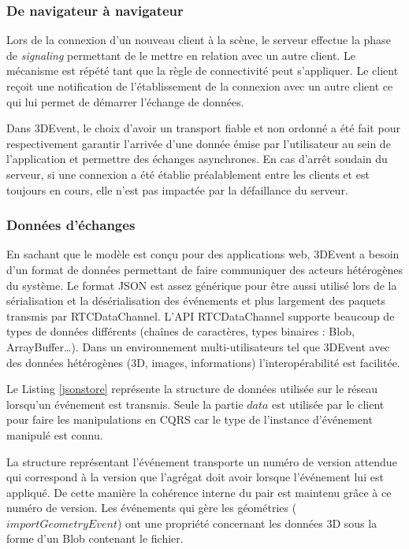 \subsubsection{De navigateur à navigateur}
Lors de la connexion d'un nouveau client à la scène, le serveur effectue la phase 
de \textit{signaling} permettant de le mettre en relation avec un autre client. Le 
mécanisme est répété tant que la règle de connectivité peut s'appliquer. Le client 
reçoit une notification de l'établissement de la connexion avec un autre client ce 
qui lui permet de démarrer l'échange de données.

Dans 3DEvent, le choix d'avoir un transport fiable et non ordonné a été fait pour 
respectivement garantir l'arrivée d'une donnée émise par l'utilisateur au sein de 
l'application et permettre des échanges asynchrones.
En cas d'arrêt soudain du serveur, si une connexion a été établie préalablement 
entre les clients et est toujours en cours, elle n'est pas impactée par la défaillance 
du serveur.
\subsubsection{Données d'échanges}

En sachant que le modèle est conçu pour des applications web, 3DEvent a besoin 
d'un format de données permettant de faire communiquer des acteurs hétérogènes 
du système.
Le format \gls{JSON} est assez générique pour être aussi utilisé lors de la 
sérialisation et la désérialisation des 
événements et plus largement des paquets transmis par RTCDataChannel. 
L'\acrshort{API} RTCDataChannel supporte beaucoup de types de données 
différents (chaînes de caractères, types binaires : Blob, ArrayBuffer\dots). Dans 
un environnement multi-utilisateurs tel que 3DEvent avec des données 
hétérogènes (3D, images, 
informations) l'interopérabilité est facilitée.

Le Listing  \ref{jsonstore} représente la structure de données utilisée sur le réseau 
lorsqu'un événement est transmis. Seule la partie $data$ est utilisée par le client
pour faire les manipulations en \gls{CQRS} car le type de l'instance d'événement 
manipulé est connu. 

La structure représentant l'événement transporte un numéro de version \og 
attendue\fg{} 
qui correspond à la version que l'agrégat doit avoir lorsque l'événement lui est 
appliqué. De cette manière la cohérence interne du pair est maintenu grâce à ce 
numéro de version.
Les événements qui gère les géométries ($importGeometryEvent$) ont une 
propriété concernant les données 3D sous la forme d'un Blob contenant le fichier. 

